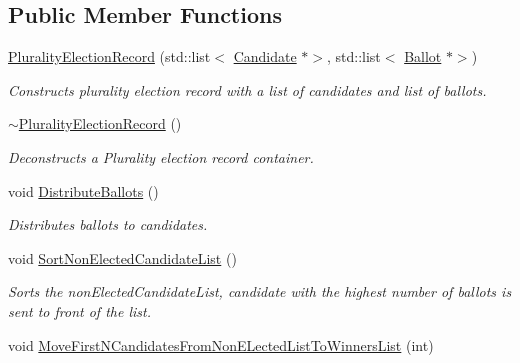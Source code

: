 \subsection*{Public Member Functions}
\begin{DoxyCompactItemize}
\item 
\hyperlink{classPluralityElectionRecord_a6cc4b921ebfed3f5003b3047fae68fc5}{Plurality\+Election\+Record} (std\+::list$<$ \hyperlink{classCandidate}{Candidate} $\ast$$>$, std\+::list$<$ \hyperlink{classBallot}{Ballot} $\ast$$>$)
\begin{DoxyCompactList}\small\item\em Constructs plurality election record with a list of candidates and list of ballots. \end{DoxyCompactList}\item 
\mbox{\label{classPluralityElectionRecord_ae04ff63f885d88bb3160621802855413}} 
\hyperlink{classPluralityElectionRecord_ae04ff63f885d88bb3160621802855413}{$\sim$\+Plurality\+Election\+Record} ()
\begin{DoxyCompactList}\small\item\em Deconstructs a Plurality election record container. \end{DoxyCompactList}\item 
\mbox{\label{classPluralityElectionRecord_a0429e5fd83d0583d0077c51b163cae23}} 
void \hyperlink{classPluralityElectionRecord_a0429e5fd83d0583d0077c51b163cae23}{Distribute\+Ballots} ()
\begin{DoxyCompactList}\small\item\em Distributes ballots to candidates. \end{DoxyCompactList}\item 
\mbox{\label{classPluralityElectionRecord_a922a4048844b20b6eb5702abc7c99b97}} 
void \hyperlink{classPluralityElectionRecord_a922a4048844b20b6eb5702abc7c99b97}{Sort\+Non\+Elected\+Candidate\+List} ()
\begin{DoxyCompactList}\small\item\em Sorts the non\+Elected\+Candidate\+List, candidate with the highest number of ballots is sent to front of the list. \end{DoxyCompactList}\item 
void \hyperlink{classPluralityElectionRecord_a9463aecae88c5decfdbb793678b16c87}{Move\+First\+N\+Candidates\+From\+Non\+E\+Lected\+List\+To\+Winners\+List} (int)

\end{DoxyCompactItemize}
